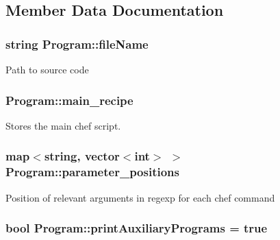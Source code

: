 \subsection{Member Data Documentation}
\hypertarget{classProgram_a8b56614562949906e79e18efdd88d554}{
\subsubsection[{file\-Name}]{\setlength{\rightskip}{0pt plus 5cm}string Program\-::file\-Name\hspace{0.3cm}{\ttfamily [private]}}}\label{classProgram_a8b56614562949906e79e18efdd88d554}
Path to source code \hypertarget{classProgram_a414bb40153c7da0e1815b7140c4aa454}{
\subsubsection[{main\-\_\-recipe}]{ Program\-::main\-\_\-recipe\hspace{0.3cm}{\ttfamily [private]}}}\label{classProgram_a414bb40153c7da0e1815b7140c4aa454}
Stores the main chef script. \hypertarget{classProgram_a941f96a02d5fd027979cbc7b484f04c7}{
\subsubsection[{parameter\-\_\-positions}]{\setlength{\rightskip}{0pt plus 5cm}map$<$string, vector$<$int$>$ $>$ Program\-::parameter\-\_\-positions\hspace{0.3cm}{\ttfamily [private]}}}\label{classProgram_a941f96a02d5fd027979cbc7b484f04c7}
Position of relevant arguments in regexp for each chef command \hypertarget{classProgram_ad4371cad6bc5c0f4cd232007a2324205}{
\subsubsection[{print\-Auxiliary\-Programs}]{\setlength{\rightskip}{0pt plus 5cm}bool Program\-::print\-Auxiliary\-Programs = true\hspace{0.3cm}{\ttfamily [private]}}}\label{classProgram_ad4371cad6bc5c0f4cd232007a2324205}
